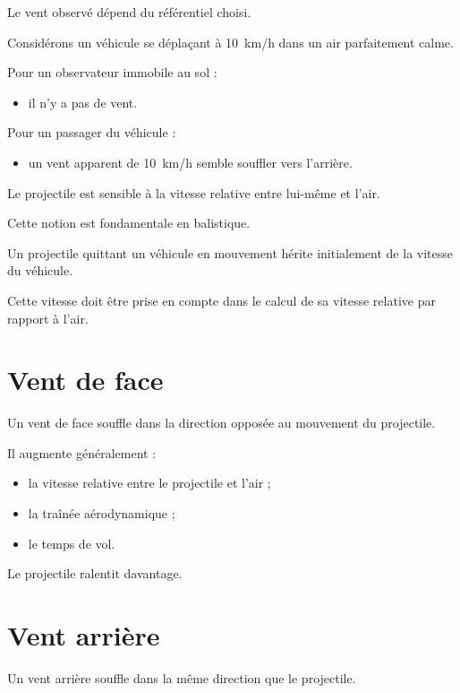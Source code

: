 Le vent observé dépend du référentiel choisi.

Considérons un véhicule se déplaçant à 10~km/h dans un air parfaitement calme.

Pour un observateur immobile au sol :

\begin{itemize}
\item il n'y a pas de vent.
\end{itemize}

Pour un passager du véhicule :

\begin{itemize}
\item un vent apparent de 10~km/h semble souffler vers l'arrière.
\end{itemize}

Le projectile est sensible à la vitesse relative entre lui-même et l'air.

Cette notion est fondamentale en balistique.

\begin{exemple}

Un projectile quittant un véhicule en mouvement hérite initialement de la
vitesse du véhicule.

Cette vitesse doit être prise en compte dans le calcul de sa vitesse
relative par rapport à l'air.

\end{exemple}

\section{Vent de face}

Un vent de face souffle dans la direction opposée au mouvement du
projectile.

Il augmente généralement :

\begin{itemize}
\item la vitesse relative entre le projectile et l'air ;
\item la traînée aérodynamique ;
\item le temps de vol.
\end{itemize}

Le projectile ralentit davantage.

\section{Vent arrière}

Un vent arrière souffle dans la même direction que le projectile.

